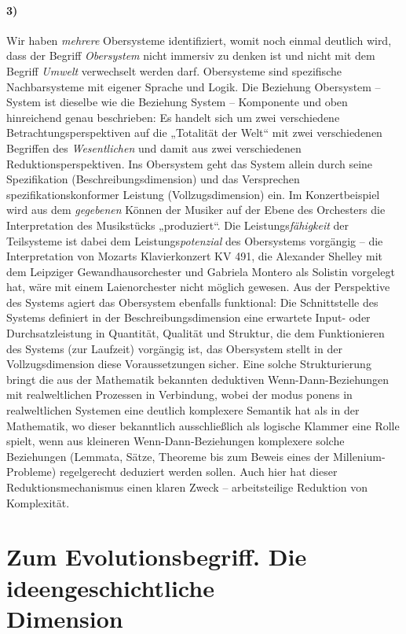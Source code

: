 \documentclass[12pt,a4paper]{article}
\begin{document}
\paragraph{3)}
Wir haben \emph{mehrere} Obersysteme identifiziert, womit noch einmal deutlich
wird, dass der Begriff \emph{Obersystem} nicht immersiv zu denken ist und
nicht mit dem Begriff \emph{Umwelt} verwechselt werden darf. Obersysteme sind
spezifische Nachbarsysteme mit eigener Sprache und Logik. Die Beziehung
Obersystem -- System ist dieselbe wie die Beziehung System -- Komponente und
oben hinreichend genau beschrieben: Es handelt sich um zwei verschiedene
Betrachtungsperspektiven auf die „Totalität der Welt“ mit zwei verschiedenen
Begriffen des \emph{Wesentlichen} und damit aus zwei verschiedenen
Reduktionsperspektiven. Ins Obersystem geht das System allein durch seine
Spezifikation (Beschreibungsdimension) und das Versprechen
spezifikationskonformer Leistung (Vollzugsdimension) ein. Im Konzertbeispiel
wird aus dem \emph{gegebenen} Können der Musiker auf der Ebene des Orchesters
die Interpretation des Musikstücks „produziert“.  Die
Leistungs\emph{fähigkeit} der Teilsysteme ist dabei dem
Leistungs\emph{potenzial} des Obersystems vorgängig -- die Interpretation von
Mozarts Klavierkonzert KV 491, die Alexander Shelley mit dem Leipziger
Gewandhausorchester und Gabriela Montero als Solistin vorgelegt hat, wäre mit
einem Laienorchester nicht möglich gewesen. Aus der Perspektive des Systems
agiert das Obersystem ebenfalls funktional: Die Schnittstelle des Systems
definiert in der Beschreibungsdimension eine erwartete Input- oder
Durchsatzleistung in Quantität, Qualität und Struktur, die dem Funktionieren
des Systems (zur Laufzeit) vorgängig ist, das Obersystem stellt in der
Vollzugsdimension diese Voraussetzungen sicher. Eine solche Strukturierung
bringt die aus der Mathematik bekannten deduktiven Wenn-Dann-Beziehungen mit
realweltlichen Prozessen in Verbindung, wobei der modus ponens in
realweltlichen Systemen eine deutlich komplexere Semantik hat als in der
Mathematik, wo dieser bekanntlich ausschließlich als logische Klammer eine
Rolle spielt, wenn aus kleineren Wenn-Dann-Beziehungen komplexere solche
Beziehungen (Lemmata, Sätze, Theoreme bis zum Beweis eines der
Millenium-Probleme) regelgerecht deduziert werden sollen.  Auch hier hat
dieser Reduktionsmechanismus einen klaren Zweck -- arbeitsteilige Reduktion
von Komplexität.

\section{Zum Evolutionsbegriff. Die ideengeschichtliche\\ Dimension}
\end{document}
